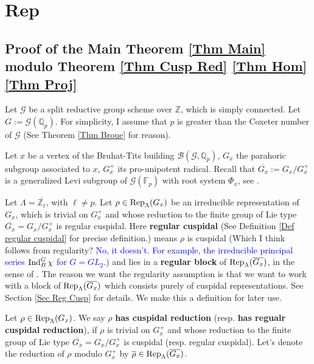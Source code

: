 
	\chapter{Rep}
	
	\section{Proof of the Main Theorem \ref{Thm Main} modulo Theorem \ref{Thm Cusp Red} \ref{Thm Hom} \ref{Thm Proj}}
	Let $\mathcal{G}$ be a split reductive group scheme over $\mathbb{Z}$, which is simply connected. Let $G:=\mathcal{G}(\mathbb{Q}_p)$. For simplicity, I assume that $p$ is greater than the Coxeter number of $\mathcal{G}$ (See Theorem \ref{Thm Broue} for reason).
	
	Let $x$ be a vertex of the Bruhat-Tits building $\mathcal{B}(\mathcal{G}, \mathbb{Q}_p)$, $G_x$ the parahoric subgroup associated to $x$, $G_x^+$ its pro-unipotent radical. Recall that $\overline{G_x}:=G_x/G_x^+$ is a generalized Levi subgroup of $\mathcal{G}(\mathbb{F}_p)$ with root system $\Phi_x$, see \cite[Theorem 3.17]{rabinoff2003bruhat}. 
	
	Let $\Lambda=\overline{\mathbb{Z}_\ell}$, with $\ell \neq p$. Let $\rho \in \operatorname{\operatorname{Rep}}_{\Lambda}(G_x)$ be an irreducible representation of $G_x$, which is trivial on $G_x^+$ and whose reduction to the finite group of Lie type $\overline{G_x}=G_x/G_x^+$ is  
	regular cuspidal. Here \textbf{regular cuspidal} (See Definition \ref{Def regular cuspidal} for precise definition.) means $\rho$ is cuspidal (Which I think follows from regularity? \textcolor{blue}{No, it doesn't. For example, the irreducible principal series $\operatorname{\operatorname{Ind}}_B^G\chi$ for $G=GL_2$.}) and lies in a \textbf{regular block} of $\operatorname{\operatorname{Rep}}_{\Lambda}(\overline{G_x})$, in the sense of \cite{broue1990isometries}. The reason we want the regularity assumption is that we want to work with a block of $\operatorname{\operatorname{Rep}}_{\Lambda}(\overline{G_x})$ which consists purely of cuspidal representations. See Section \ref{Sec Reg Cusp} for details. We make this a definition for later use.
	
	\begin{definition}
		Let $\rho \in \operatorname{\operatorname{Rep}}_{\Lambda}(G_x)$. We say $\rho$ \textbf{has cuspidal reduction} (resp. \textbf{has regualr cuspidal reduction}), if $\rho$ is trivial on $G_x^+$ and whose reduction to the finite group of Lie type $\overline{G_x}=G_x/G_x^+$ is cuspidal (resp. regular cuspidal). Let's denote the reduction of $\rho$ modulo $G_x^+$ by $\overline{\rho} \in \operatorname{\operatorname{Rep}}_{\Lambda}(\overline{G_x})$.
	\end{definition}
	
